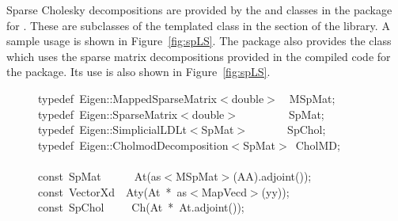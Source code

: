 \documentclass[shortnames,article]{jss}
\newcommand{\hlstd}[1]{\textcolor[rgb]{0,0,0}{#1}}
\newcommand{\hlopt}[1]{\textcolor[rgb]{0,0,0}{#1}}
\newcommand{\hlkwb}[1]{\textcolor[rgb]{0.13,0.54,0.13}{#1}}
\newcommand{\hlkwc}[1]{\textcolor[rgb]{0,0,1}{#1}}
\newcommand{\hlkwd}[1]{\textcolor[rgb]{0,0,0}{#1}}
\begin{document}
Sparse Cholesky decompositions are provided by the
 and  classes in the
 package for .  These are
subclasses of the  templated class in the
 section of the  library.  A sample usage
is shown in Figure~\ref{fig:spLS}.  The  package also
provides the  class which uses the
 sparse matrix decompositions provided in the compiled
code for the  package.  Its use is also shown in
Figure~\ref{fig:spLS}.

\begin{figure}[htb]
    \noindent
    \ttfamily
    \hlstd{}\hlkwc{typedef\ }\hlstd{Eigen}\hlopt{::}\hlstd{MappedSparseMatrix}\hlopt{$<$}\hlstd{}\hlkwb{double}\hlstd{}\hlopt{$>$}\hlstd{\ \ }\hlopt{}\hlstd{MSpMat}\hlopt{;}\hspace*{\fill}\\
    \hlstd{}\hlkwc{typedef\ }\hlstd{Eigen}\hlopt{::}\hlstd{SparseMatrix}\hlopt{$<$}\hlstd{}\hlkwb{double}\hlstd{}\hlopt{$>$}\hlstd{\ \ \ \ \ \ \ \ \ }\hlopt{}\hlstd{SpMat}\hlopt{;}\hspace*{\fill}\\
    \hlstd{}\hlkwc{typedef\ }\hlstd{Eigen}\hlopt{::}\hlstd{SimplicialLDLt}\hlopt{$<$}\hlstd{SpMat}\hlopt{$>$}\hlstd{\ \ \ \ \ \ \ }\hlopt{}\hlstd{SpChol}\hlopt{;}\hspace*{\fill}\\
    \hlstd{}\hlkwc{typedef\ }\hlstd{Eigen}\hlopt{::}\hlstd{CholmodDecomposition}\hlopt{$<$}\hlstd{SpMat}\hlopt{$>$\ }\hlstd{CholMD}\hlopt{;}\hspace*{\fill}\\
    \hlstd{}\hspace*{\fill}\\
    \hlkwb{const\ }\hlstd{SpMat}\hlstd{\ \ \ \ \ \ }\hlstd{}\hlkwd{At}\hlstd{}\hlopt{(}\hlstd{as}\hlopt{$<$}\hlstd{MSpMat}\hlopt{$>$(}\hlstd{AA}\hlopt{).}\hlstd{}\hlkwd{adjoint}\hlstd{}\hlopt{());}\hspace*{\fill}\\
    \hlstd{}\hlkwb{const\ }\hlstd{VectorXd}\hlstd{\ \ }\hlstd{}\hlkwd{Aty}\hlstd{}\hlopt{(}\hlstd{At\ }\hlopt{{*}\ }\hlstd{as}\hlopt{$<$}\hlstd{MapVecd}\hlopt{$>$(}\hlstd{yy}\hlopt{));}\hspace*{\fill}\\
    \hlstd{}\hlkwb{const\ }\hlstd{SpChol}\hlstd{\ \ \ \ \ }\hlstd{}\hlkwd{Ch}\hlstd{}\hlopt{(}\hlstd{At\ }\hlopt{{*}\ }\hlstd{At}\hlopt{.}\hlstd{}\hlkwd{adjoint}\hlstd{}\hlopt{());}\hspace*{\fill}\\

\end{figure}
\end{document}
